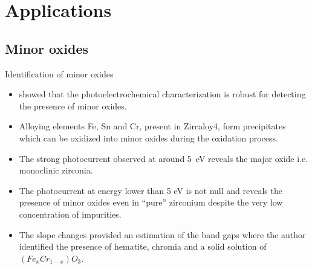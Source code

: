 \documentclass[10pt,compress]{beamer}
\begin{document}
\section{Applications}
\subsection{Minor oxides}
    \begin{frame}[allowframebreaks=1.0]{Identification of minor oxides}
        \begin{itemize}
            \item \citet{benaboud2007} showed that the photoelectrochemical characterization 
            is robust for detecting the presence of minor oxides. 
            \item Alloying elements Fe, Sn and Cr, present in Zircaloy4, form precipitates 
            which can be oxidized into minor oxides during the oxidation process.
            \item The strong photocurrent observed at around 5~eV 
                  reveals the major oxide i.e. monoclinic zirconia. 
            \item The photocurrent at energy lower than 5 eV is not null and reveals the 
                  presence of minor oxides even in “pure” zirconium despite the very low 
                  concentration of impurities. 
            \item The slope changes provided an estimation of the band gaps where the author 
                  identified the presence of hematite, chromia and a solid solution of 
                  $(Fe_xCr_{1-x})O_3$. 
        \end{itemize}


\end{frame}
\end{document}
